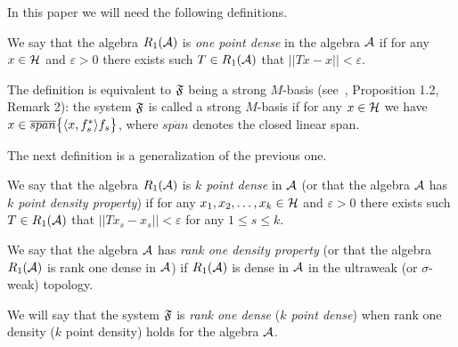 \documentclass[12pt,oneside,a4paper]{amsart}
\begin{document}
  In this paper we will need the following definitions.
  \begin{definition}
    \label{1pd}
    We say that the algebra $R_1(\cal{A})$ is \emph{one point dense} in the algebra $\cal{A}$ if for any $x \in \cal{H}$ and $\varepsilon > 0$
      there exists such $T\in R_1(\cal{A})$ that $||Tx - x|| < \varepsilon$.
  \end{definition}

    The definition is equivalent to $\fsys$ being a strong $M$-basis (see~\cite{katavolos}, Proposition 1.2, Remark 2):
    the system $\fsys$ is called a strong $M$-basis if for any $x\in\cal{H}$ we have $x \in \overline{span}\big\{\inner{x}{f^*_s}f_s\big\}$, where $\overline{span}$ denotes the closed linear span.

  The next definition is a generalization of the previous one.
  \begin{definition}
    \label{kpd}
    We say that the algebra $R_1(\cal{A})$ is \emph{$k$ point dense} in $\cal{A}$ (or that the algebra $\cal{A}$ has
      \emph{$k$ point density property}) if for any $x_1, x_2, \dots, x_k \in \cal{H}$ and $\varepsilon > 0$
      there exists such $T\in R_1(\cal{A})$ that $||Tx_s - x_s|| < \varepsilon$ for any $1 \leq s \leq k$.
  \end{definition}

  \begin{definition}
    \label{r1d}
    We say that the algebra $\cal{A}$ has \emph{rank one density property} (or that the algebra $R_1(\cal{A})$
      is rank one dense in $\cal{A}$) if
      $R_1(\cal{A})$ is dense in $\cal{A}$ in the ultraweak (or $\sigma$-weak) topology.
  \end{definition}
  We will say that the system $\fsys$ is \emph{rank one dense} (\emph{$k$ point dense})
    when rank one density ($k$ point density) holds for the algebra $\cal{A}$.

\end{document}
